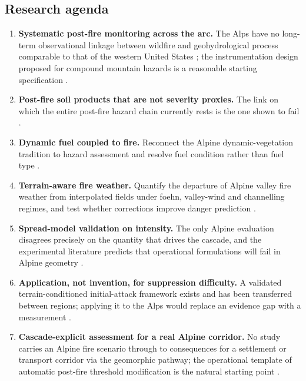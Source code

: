 \documentclass[11pt,a4paper]{article}
\begin{document}
\subsection{Research agenda}

\begin{enumerate}
    \item \textbf{Systematic post-fire monitoring across the arc.} The Alps have no long-term observational linkage between wildfire and geohydrological process comparable to that of the western United States \citep{melzner_wildfire-induced_2025}; the instrumentation design proposed for compound mountain hazards is a reasonable starting specification \citep{baselt_compound_2026}.
    \item \textbf{Post-fire soil products that are not severity proxies.} The link on which the entire post-fire hazard chain currently rests is the one shown to fail \citep{negri_wildfire_2026}.
    \item \textbf{Dynamic fuel coupled to fire.} Reconnect the Alpine dynamic-vegetation tradition to hazard assessment and resolve fuel condition rather than fuel type \citep{schumacher_relative_2006, hillebrand_contrasting_2023, muller_towards_2020}.
    \item \textbf{Terrain-aware fire weather.} Quantify the departure of Alpine valley fire weather from interpolated fields under foehn, valley-wind and channelling regimes, and test whether corrections improve danger prediction \citep{ozaki_impact_2022, sharples_overview_2009}.
    \item \textbf{Spread-model validation on intensity.} The only Alpine evaluation disagrees precisely on the quantity that drives the cascade, and the experimental literature predicts that operational formulations will fail in Alpine geometry \citep{malanchini_modeling_2025, hayajneh_wind_2026}.
    \item \textbf{Application, not invention, for suppression difficulty.} A validated terrain-conditioned initial-attack framework exists and has been transferred between regions; applying it to the Alps would replace an evidence gap with a measurement \citep{cardil_assessing_2025}.
    \item \textbf{Cascade-explicit assessment for a real Alpine corridor.} No study carries an Alpine fire scenario through to consequences for a settlement or transport corridor via the geomorphic pathway; the operational template of automatic post-fire threshold modification is the natural starting point \citep{tiranti_wildfires_2021}.

\end{enumerate}
\end{document}
